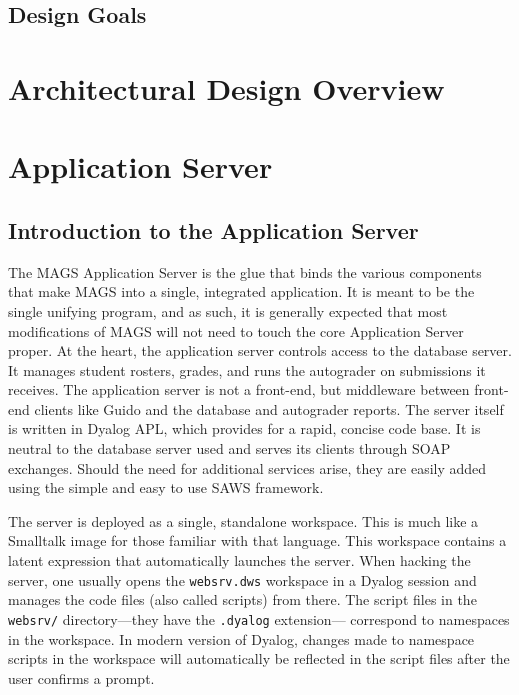 \section{Design Goals}



\chapter{Architectural Design Overview}

\chapter{Application Server}

\section{Introduction to the Application Server}

\noindent
The MAGS Application Server is the glue that binds the various components that 
make MAGS into a single, integrated application. It is meant to be the single
unifying program, and as such, it is generally expected that most modifications
of MAGS will not need to touch the core Application Server proper. At the 
heart, the application server controls access to the database server. It manages
student rosters, grades, and runs the autograder on submissions it receives.
The application server is not a front-end, but middleware between front-end
clients like Guido and the database and autograder reports.
The server itself is written in Dyalog APL, which provides for a rapid, concise 
code base. It is neutral to the database server used and serves its clients 
through SOAP exchanges. Should the need for additional services arise, 
they are easily added using the simple and easy to use SAWS framework.

The server is deployed as a single, standalone workspace. This is much like a 
Smalltalk image for those familiar with that language. This workspace contains
a latent expression that automatically launches the server. When hacking the 
server, one usually opens the {\tt websrv.dws} workspace in a Dyalog session
and manages the code files (also called scripts) from there. The script files 
in the {\tt websrv/} directory---they have the {\tt .dyalog} extension---
correspond to namespaces in the workspace. In modern version of Dyalog, 
changes made to namespace scripts in the workspace will automatically be 
reflected in the script files after the user confirms a prompt.

